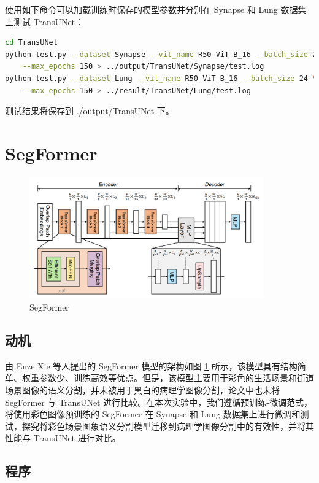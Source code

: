 \documentclass[hyperref,a4paper,UTF8]{ctexart}
\begin{document}
使用如下命令可以加载训练时保存的模型参数并分别在 Synapse 和 Lung 数据集上测试 TransUNet：

\begin{lstlisting}[language=bash]
cd TransUNet
python test.py --dataset Synapse --vit_name R50-ViT-B_16 --batch_size 22 \
    --max_epochs 150 > ../output/TransUNet/Synapse/test.log
python test.py --dataset Lung --vit_name R50-ViT-B_16 --batch_size 24 \
    --max_epochs 150 > ../result/TransUNet/Lung/test.log
\end{lstlisting}

测试结果将保存到 ./output/TransUNet 下。

\section{SegFormer}

\begin{figure}[h]
    \centering
    \includegraphics[width=0.9\textwidth]{figures/SegFormer.png}
    \caption{SegFormer}
    \label{fig:SegFormer}
\end{figure}

\subsection{动机}

由 Enze Xie 等人提出的 SegFormer 模型\cite{ref2}的架构如图 \ref{fig:SegFormer} 所示，该模型具有结构简单、权重参数少、训练高效等优点。但是，该模型主要用于彩色的生活场景和街道场景图像的语义分割，并未被用于黑白的病理学图像分割，论文中也未将 SegFormer 与 TransUNet 进行比较。在本次实验中，我们遵循预训练-微调范式，将使用彩色图像预训练的 SegFormer 在 Synapse 和 Lung 数据集上进行微调和测试，探究将彩色场景图象语义分割模型迁移到病理学图像分割中的有效性，并将其性能与 TransUNet 进行对比。

\subsection{程序}
\end{document}
